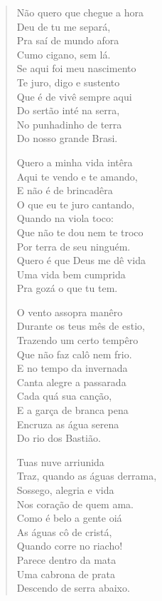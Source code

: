 \begin{verse}
Não quero que chegue a hora\\
Deu de tu me separá,\\
Pra saí de mundo afora\\
Cumo cigano, sem lá.\\
Se aqui foi meu nascimento\\
Te juro, digo e sustento\\
Que é de vivê sempre aqui\\
Do sertão inté na serra,\\
No punhadinho de terra\\
Do nosso grande Brasi.

Quero a minha vida intêra\\
Aqui te vendo e te amando,\\
E não é de brincadêra\\
O que eu te juro cantando,\\
Quando na viola toco:\\
Que não te dou nem te troco\\
Por terra de seu ninguém.\\
Quero é que Deus me dê vida\\
Uma vida bem cumprida\\
Pra gozá o que tu tem.

O vento assopra manêro\\
Durante os teus mês de estio,\\
Trazendo um certo tempêro\\
Que não faz calô nem frio.\\
E no tempo da invernada\\
Canta alegre a passarada\\
Cada quá sua canção,\\
E a garça de branca pena\\
Encruza as água serena\\
Do rio dos Bastião.

Tuas nuve arriunida\\
Traz, quando as águas derrama,\\
Sossego, alegria e vida\\
Nos coração de quem ama.\\
Como é belo a gente oiá\\
As águas cô de cristá,\\
Quando corre no riacho!\\
Parece dentro da mata\\
Uma cabrona de prata\\
Descendo de serra abaixo.


\end{verse}
